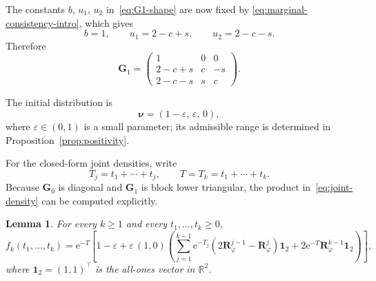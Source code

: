 \documentclass[11pt]{article}
\newtheorem{lemma}[theorem]{Lemma}
\theoremstyle{definition}
\theoremstyle{remark}
\newcommand{\e}{\mathrm{e}}
\begin{document}
The constants $b$, $u_1$, $u_2$ in~\eqref{eq:G1-shape} are now fixed by \eqref{eq:marginal-consistency-intro}, which gives
\begin{equation}\label{eq:u-def}
b=1,
\qquad
u_1=2-c+s,
\qquad
u_2=2-c-s.
\end{equation}
Therefore
\begin{equation}\label{eq:full-G1}
\bm{G}_1=
\begin{pmatrix}
1 & 0 & 0\\
2-c+s & c & -s\\
2-c-s & s & c
\end{pmatrix}.
\end{equation}

The initial distribution is
\begin{equation}\label{eq:full-nu}
\bm{\nu}=(1-\varepsilon,\,\varepsilon,\,0),
\end{equation}
where $\varepsilon\in(0,1)$ is a small parameter; its admissible range is determined in Proposition~\ref{prop:positivity}.

For the closed-form joint densities, write
\[
T_j=t_1+\cdots+t_j,
\qquad
T=T_k=t_1+\cdots+t_k.
\]
Because $\bm{G}_0$ is diagonal and $\bm{G}_1$ is block lower triangular, the product in~\eqref{eq:joint-density} can be computed explicitly.
\begin{lemma}\label{lem:density-formula}
For every $k\ge 1$ and every $t_1,\dots,t_k\ge 0$,
\begin{equation}\label{eq:density-formula}
f_k(t_1,\dots,t_k)
=
\e^{-T}
\left[
1-\varepsilon
+
\varepsilon\,(1,0)
\left(
\sum_{j=1}^{k-1}
\e^{-T_j}(2\bm{R}_\varphi^{j-1}-\bm{R}_\varphi^j)\bm{1}_2
+
2\e^{-T}\bm{R}_\varphi^{k-1}\bm{1}_2
\right)
\right],
\end{equation}
where $\bm{1}_2=(1,1)^\top$ is the all-ones vector in $\mathbb{R}^2$.
\end{lemma}
\end{document}
